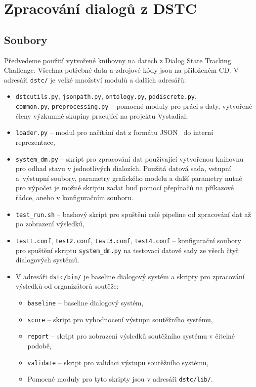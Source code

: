 \chapter{Zpracování dialogů z DSTC}
\label{ap:dstc}

\section{Soubory}
\label{sec:dstcfiles}
Předvedeme použití vytvořené knihovny na datech z Dialog State Tracking Challenge.
Všechna potřebné data a zdrojové kódy jsou na přiloženém CD.
V adresáři \texttt{dstc/} je velké množství modulů a dalších adresářů:
\begin{itemize}
\item \texttt{dstcutils.py}, \texttt{jsonpath.py}, \texttt{ontology.py}, \texttt{pddiscrete.py}, \\\texttt{common.py}, \texttt{preprocessing.py} -- pomocné moduly pro práci s daty, vytvořené členy výzkumné skupiny pracující na projektu Vystadial,

\item \texttt{loader.py} -- modul pro načítání dat z formátu JSON~\cite{crockford2006application} do interní reprezentace, 

\item \texttt{system\_dm.py} -- skript pro zpracování dat používající vytvořenou knihovnu pro odhad stavu v jednotlivých dialozích.
Použitá datová sada, vstupní a~výstupní soubory, parametry grafického modelu a další parametry nutné pro výpočet je možné skriptu zadat buď pomocí přepínačů na příkazové řádce, anebo v konfiguračním souboru.

\item \texttt{test\_run.sh} -- bashový skript pro spuštění celé pipeline od zpracování dat až po zobrazení výsledků,

\item \texttt{test1.conf}, \texttt{test2.conf}, \texttt{test3.conf}, \texttt{test4.conf} -- konfigurační soubory pro spuštění skriptu \texttt{system\_dm.py} na testovací datové sady ze všech čtyř dialogových systémů.

\item V adresáři \texttt{dstc/bin/} je baseline dialogový systém a skripty pro zpracování výsledků od organizátorů soutěže:
	\begin{itemize}
	\item \texttt{baseline} -- baseline dialogový systém,
	\item \texttt{score} -- skript pro vyhodnocení výstupu soutěžního systému,
	\item \texttt{report} -- skript pro zobrazení výsledků soutěžního systému v čitelné podobě,
	\item \texttt{validate} -- skript pro validaci výstupu soutěžního systému,
	\item Pomocné moduly pro tyto skripty jsou v adresáři \texttt{dstc/lib/}.
	\end{itemize}


\end{itemize}
